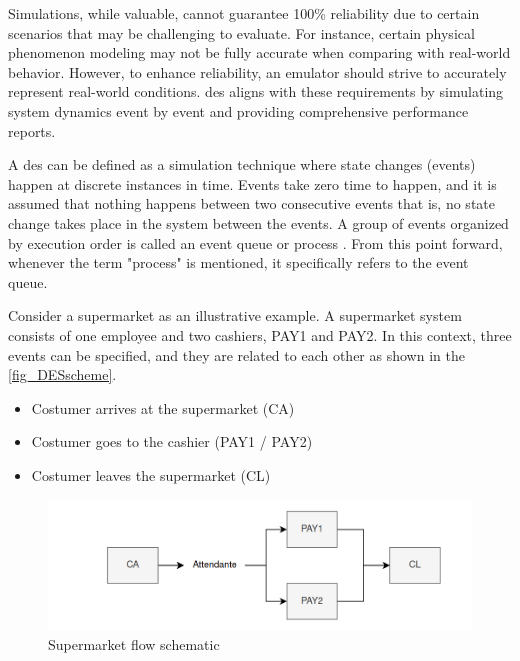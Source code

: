 
Simulations, while valuable, cannot guarantee 100\% reliability due to certain scenarios that may be challenging to evaluate. For instance, certain physical phenomenon modeling may not be fully accurate when comparing with real-world behavior. However, to enhance reliability, an emulator should strive to accurately represent real-world conditions. \gls{des} aligns with these requirements by simulating system dynamics event by event and providing comprehensive performance reports.

A \gls{des} can be defined as a simulation technique where state changes (events) happen at discrete instances in time. Events take zero time to happen, and it is assumed that nothing happens between two consecutive events that is, no state change takes place in the system between the events. A group of events organized by execution order is called an event queue or process \cite{DESVarga} \cite{SimulationBook}. From this point forward, whenever the term "process" is mentioned, it specifically refers to the event queue.

Consider a supermarket as an illustrative example. A supermarket system consists of one employee and two cashiers, PAY1 and PAY2. In this context, three events can be specified, and they are related to each other as shown in the \autoref{fig_DESscheme}.

\begin{itemize}
    \item Costumer arrives at the supermarket (CA)
    \item Costumer goes to the cashier (PAY1 / PAY2)
    \item Costumer leaves the supermarket (CL)
\end{itemize}

\begin{figure}[H]
	\centering
 	\includegraphics[width=0.9\linewidth]{Images/DES_Scheme.png}
 	\caption{Supermarket flow schematic}
	 \label{fig_DESscheme}
\end{figure}

